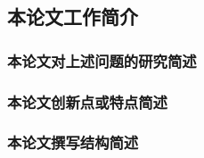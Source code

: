     \subsection{本论文工作简介}
        \subsubsection{本论文对上述问题的研究简述}




        \subsubsection{本论文创新点或特点简述}




        \subsubsection{本论文撰写结构简述}

